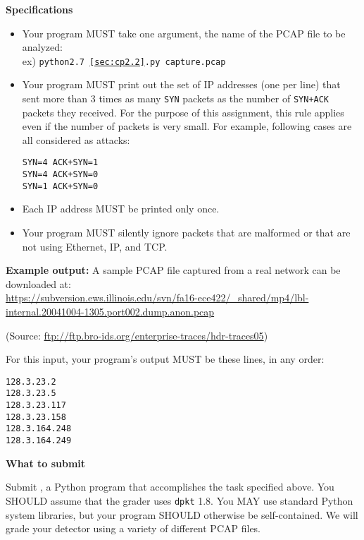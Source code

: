 \textbf{Specifications}
\begin{itemize}
  \item Your program MUST take one argument, the name of the PCAP file to be analyzed:\\
    ex) \texttt{python2.7 \ref{sec:cp2.2}.py capture.pcap}
  \item Your program MUST print out the set of IP addresses (one per line) that sent more than 3 times as many \texttt{SYN} packets as the number of \texttt{SYN+ACK} packets they received.
  For the purpose of this assignment, this rule applies even if the number of packets is very small.
  For example, following cases are all considered as attacks:
\begin{mdframed}
\begin{verbatim}
SYN=4 ACK+SYN=1
SYN=4 ACK+SYN=0
SYN=1 ACK+SYN=0
\end{verbatim}
\end{mdframed}
  \item Each IP address MUST be printed only once.
  \item Your program MUST silently ignore packets that are malformed or that are not using Ethernet, IP, and TCP.
\end{itemize}

\pagebreak

\textbf{Example output:}
A sample PCAP file captured from a real network can be downloaded at:\\
\url{https://subversion.ews.illinois.edu/svn/fa16-ece422/\_shared/mp4/lbl-internal.20041004-1305.port002.dump.anon.pcap}

\begingroup\raggedleft
(Source: \url{ftp://ftp.bro-ids.org/enterprise-traces/hdr-traces05})\\
\endgroup

For this input, your program's output MUST be these lines, in any order:
\vspace{-6pt}
\begin{mdframed}
\begin{verbatim}
128.3.23.2
128.3.23.5
128.3.23.117
128.3.23.158
128.3.164.248
128.3.164.249
\end{verbatim}
\end{mdframed}

\smallskip

\hypertarget{cp2anomaly}{\textbf{What to submit}\hspace{10pt}}
Submit \texttt{\fileanomaly}, a Python program that accomplishes the task specified above.
You SHOULD assume that the grader uses \texttt{dpkt} 1.8.
You MAY use standard Python system libraries, but your program SHOULD otherwise be self-contained.
We will grade your detector using a variety of different PCAP files.

